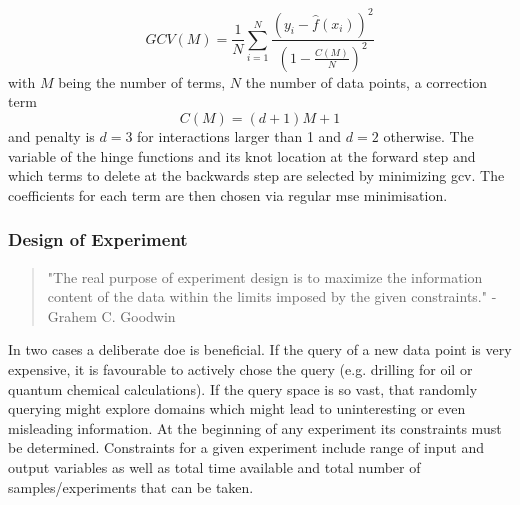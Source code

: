 \begin{equation}
    GCV(M) = \frac{1}{N} \sum_{i=1}^{N} \frac{ \left(y_i - \hat{f}(x_i) \right)^2 } {\left( 1- \frac{C(M)}{N}\right)^2 }
\end{equation}
with $M$ being the number of terms, $N$ the number of data points, a correction term
\begin{equation}
    C(M) = (d + 1)M + 1
\end{equation}
and penalty is $d=3$ for interactions larger than 1 and $d=2$ otherwise.
The variable of the hinge functions and its knot location at the forward step and which terms to delete 
at the backwards step are selected by minimizing \gls{gcv}. 
The coefficients for each term are then chosen via regular \gls{mse} minimisation\cite{friedman1988fitting}.


\subsubsection{Design of Experiment} %
%
\begin{quote}
	{"The real purpose of experiment design is to maximize the information content of the data within the limits imposed by the given constraints."}
	- {Grahem C. Goodwin\cite{goodwin1977experiment}}
\end{quote}
%
In two cases a deliberate \gls{doe} is beneficial.
If the query of a new data point is very expensive, it is favourable to actively chose the query (e.g. drilling for oil or quantum chemical calculations). 
If the query space is so vast, that randomly querying might explore domains which might lead to uninteresting or even misleading information.
% 
At the beginning of any experiment its constraints must be determined. 
%
Constraints for a given experiment include range of input and output variables as well as total time available and total number of samples/experiments that can be taken.\cite{goodwin1977experiment}
%

